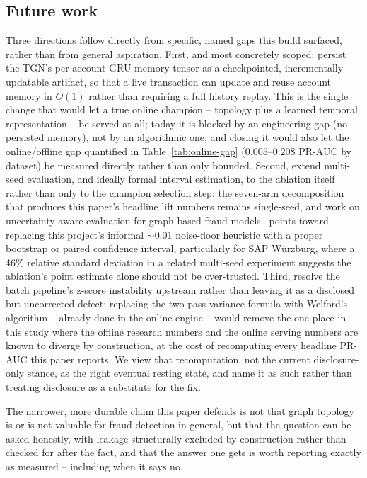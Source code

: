 \subsection{Future work}
Three directions follow directly from specific, named gaps this build
surfaced, rather than from general aspiration. First, and most concretely
scoped: persist the TGN's per-account GRU memory tensor as a checkpointed,
incrementally-updatable artifact, so that a live transaction can update and
reuse account memory in $O(1)$ rather than requiring a full history replay.
This is the single change that would let a true online champion -- topology
plus a learned temporal representation -- be served at all; today it is
blocked by an engineering gap (no persisted memory), not by an algorithmic
one, and closing it would also let the online/offline gap quantified in
Table~\ref{tab:online-gap} ($0.005$--$0.208$ PR-AUC by dataset) be measured
directly rather than only bounded. Second, extend multi-seed evaluation, and
ideally formal interval estimation, to the ablation itself rather than only
to the champion selection step: the seven-arm decomposition that produces
this paper's headline lift numbers remains single-seed, and work on
uncertainty-aware evaluation for graph-based fraud
models~\cite{shi2026uncertainty} points toward replacing this project's
informal $\sim$0.01 noise-floor heuristic with a proper bootstrap or paired
confidence interval, particularly for SAP W\"urzburg, where a 46\% relative
standard deviation in a related multi-seed experiment suggests the ablation's
point estimate alone should not be over-trusted. Third, resolve the batch
pipeline's z-score instability upstream rather than leaving it as a disclosed
but uncorrected defect: replacing the two-pass variance formula with
Welford's algorithm -- already done in the online engine -- would remove the
one place in this study where the offline research numbers and the online
serving numbers are known to diverge by construction, at the cost of
recomputing every headline PR-AUC this paper reports. We view that
recomputation, not the current disclosure-only stance, as the right eventual
resting state, and name it as such rather than treating disclosure as a
substitute for the fix.

The narrower, more durable claim this paper defends is not that graph
topology is or is not valuable for fraud detection in general, but that the
question can be asked honestly, with leakage structurally excluded by
construction rather than checked for after the fact, and that the answer one
gets is worth reporting exactly as measured -- including when it says no.
